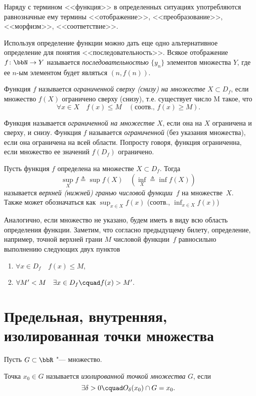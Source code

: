 Наряду с термином <<функция>> в определенных ситуациях употребляются равнозначные ему термины <<отображение>>, <<преобразование>>, <<морфизм>>, <<соответствие>>.
\begin{notion}
Используя определение функции можно дать еще одно альтернативное определение для понятия <<последовательность>>. Всякое отображение $f\colon \bbN \to Y$  называется \textit{последовательностью} $\{y_n\}$ элементов множества $Y$, где ее $n$-ым элементом будет являться $(n, f(n))$.
\end{notion} 

\begin{defn}
Функция $f$ называется \textit{ограниченной сверху (снизу) на множестве} $X\subset D_f$, если множество $f(X)$ ограничено сверху (снизу), т.е. существует число M такое, что
$$
\forall x \in X \quad f(x) \le M \quad (\text{соотв., }f(x)\ge M).
$$
\end{defn}

Функция называется \textit{ограниченной на множестве} $X$, если она на $X$ ограничена и сверху, и снизу. Функция $f$ называется \textit{ограниченной} (без указания множества), если она ограничена на всей области. Попросту говоря, функция ограниченна, если множество ее значений $f(D_f)$ ограничено.

\begin{defn}
Пусть функция $f$ определена на множестве $X\subset D_f$. Тогда 
$$
\sup_{X}\limits f \triangleq \sup f(X)\quad (\inf_{X}\limits \triangleq \inf f(X))
$$ называется \textit{верхней (нижней) гранью числовой функции~$f$} на множестве~$X$. Также может обозначаться как $\sup_{x\in X}\limits f(x)$ (соотв., $\inf_{x\in X}\limits f(x)$)
\end{defn}

Аналогично, если множество не указано, будем иметь в виду всю область определения функции. Заметим, что согласно предыдущему билету, определение, например, точной верхней грани $M$ числовой функции~$f$ равносильно выполнению следующих двух пунктов 
\begin{enumerate}
\item
$\forall x \in D_f\quad f(x) \le M$,
\item
$\forall M' < M \quad \exists x\in D_f\cquad f(x) > M'$.
\end{enumerate}

\section{Предельная, внутренняя, изолированная точки множества}
Пусть $G \subset \bbR$ "--- множество.
\begin{defn}
Точка $x_0 \in G$ называется \textit{изолированной точкой множества} $G$, если $$\exists \delta >0\cquad  O_\delta(x_0) \cap G = x_0.$$
\end{defn}

